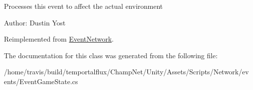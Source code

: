 Processes this event to affect the actual environment 

Author\-: Dustin Yost 

Reimplemented from \hyperlink{class_event_network_aa5e94745568f3049a2b798c066087114}{Event\-Network}.



The documentation for this class was generated from the following file\-:\begin{DoxyCompactItemize}
\item 
/home/travis/build/temportalflux/\-Champ\-Net/\-Unity/\-Assets/\-Scripts/\-Network/events/Event\-Game\-State.\-cs\end{DoxyCompactItemize}
